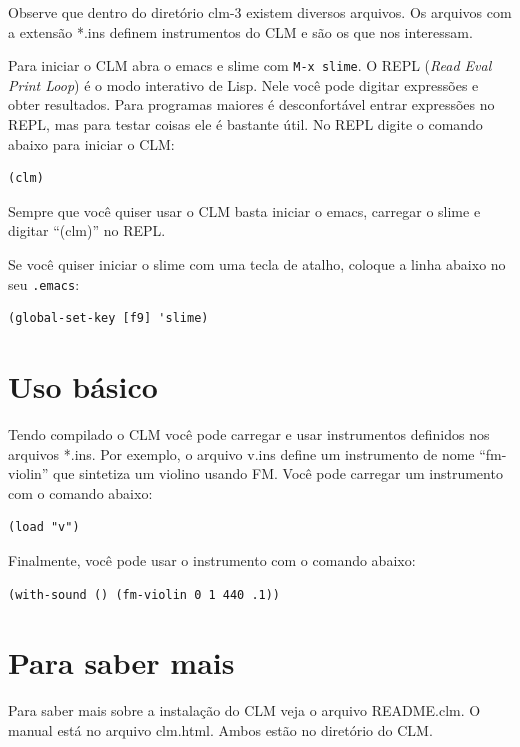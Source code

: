\documentclass[12pt,brazil]{book}
\begin{document}
Observe que dentro do diretório clm-3 existem diversos arquivos. Os
arquivos com a extensão *.ins definem instrumentos do CLM e são os que
nos interessam. 

Para iniciar o CLM abra o emacs e slime com \texttt{M-x slime}. O REPL
(\textit{Read Eval Print Loop}) é o modo interativo de Lisp. Nele você
pode digitar expressões e obter resultados. Para programas maiores é
desconfortável entrar expressões no REPL, mas para testar coisas ele é
bastante útil. No REPL digite o comando abaixo para iniciar o CLM:

\begin{verbatim}
(clm)
\end{verbatim}

Sempre que você quiser usar o CLM basta iniciar o emacs, carregar o
slime e digitar ``(clm)'' no REPL.

Se você quiser iniciar o slime com uma tecla de atalho, coloque a
linha abaixo no seu \texttt{.emacs}:

\begin{verbatim}
(global-set-key [f9] 'slime)
\end{verbatim}

\section{Uso básico}
\label{sec:uso-basico}

Tendo compilado o CLM você pode carregar e usar instrumentos definidos
nos arquivos *.ins. Por exemplo, o arquivo v.ins define um instrumento
de nome ``fm-violin'' que sintetiza um violino usando FM. Você pode
carregar um instrumento com o comando abaixo:

\begin{verbatim}
(load "v")
\end{verbatim}

Finalmente, você pode usar o instrumento com o comando abaixo:

\begin{verbatim}
(with-sound () (fm-violin 0 1 440 .1)) 
\end{verbatim}

\section{Para saber mais}
\label{sec:para-saber-mais}

Para saber mais sobre a instalação do CLM veja o arquivo README.clm.
O manual está no arquivo clm.html. Ambos estão no diretório do CLM.
\end{document}
